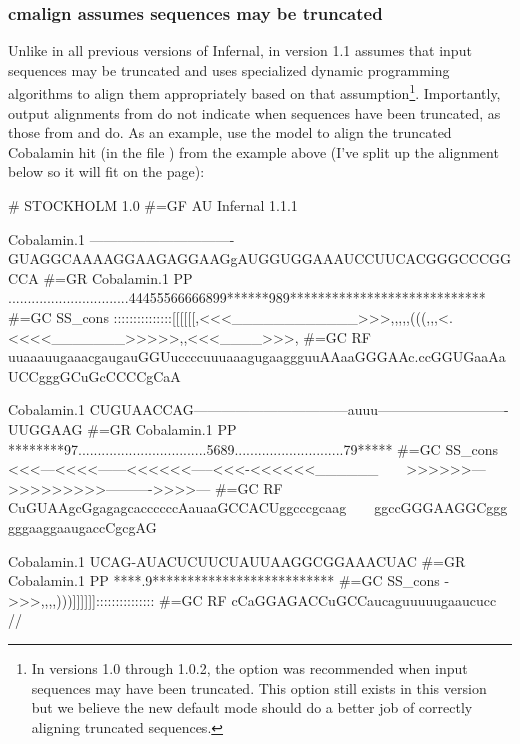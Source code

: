 \subsubsection{cmalign assumes sequences may be truncated}
Unlike in all previous versions of Infernal,  in version
1.1 assumes that input sequences may be truncated and uses specialized
dynamic programming algorithms to align them appropriately based on
that assumption\footnote{In versions 1.0 through 1.0.2, the
    option was recommended when input
  sequences may have been truncated. This option still exists in this
  version but we believe the new default mode should do a better job
  of correctly aligning truncated sequences.}. Importantly, output
alignments from  do not indicate when sequences have
been truncated, as those from  and  do. As
an example, use the  model to align the
truncated Cobalamin hit (in the file )
from the  example above (I've split up the alignment
below so it will fit on the page):


\label{cmalign-cobalamin}
\begin{sreoutput}
# STOCKHOLM 1.0
#=GF AU Infernal 1.1.1

Cobalamin.1         -------------------------------GUAGGCAAAAGGAAGAGGAAGgAUGGUGGAAAUCCUUCACGGGCCCGGCCA
#=GR Cobalamin.1 PP ...............................44455566666899******989****************************
#=GC SS_cons        :::::::::::::::[[[[[[,<<<____________>>>,,,,,(((,,,<.<<<<_______>>>>>,,<<<____>>>,
#=GC RF             uuaaauugaaacgaugauGGUuccccuuuaaagugaaggguuAAaaGGGAAc.ccGGUGaaAaUCCgggGCuGcCCCCgCaA

Cobalamin.1         CUGUAACCAG---------------------------------auuu----------------------------UUGGAAG
#=GR Cobalamin.1 PP ********97.................................5689............................79*****
#=GC SS_cons        <<<---<<<<------<<<<<<-----<<<-<<<<<<______~~~~>>>>>>--->>>>>>>>>---------->>>>---
#=GC RF             CuGUAAgcGgagagcaccccccAauaaGCCACUggcccgcaag~~~~ggccGGGAAGGCggggggaaggaaugaccCgcgAG

Cobalamin.1         UCAG-AUACUCUUCUAUUAAGGCGGAAACUAC
#=GR Cobalamin.1 PP ****.9**************************
#=GC SS_cons        ->>>,,,,)))]]]]]]:::::::::::::::
#=GC RF             cCaGGAGACCuGCCaucaguuuuugaaucucc
//
\end{sreoutput}

